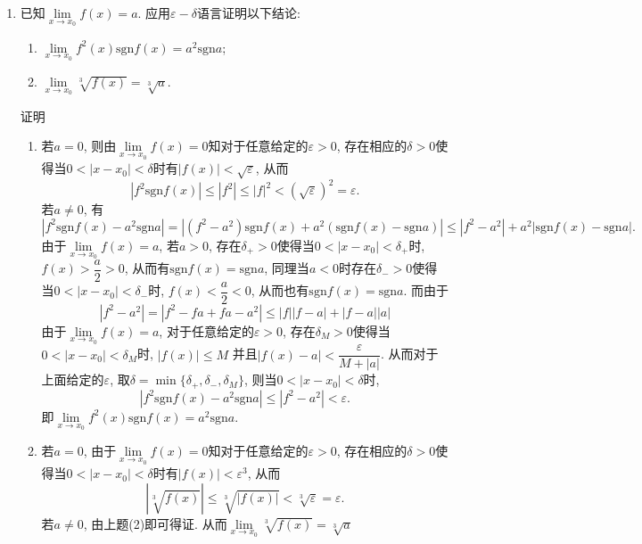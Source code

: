 \documentclass[UTF8,a4paper,20pt]{article}
\begin{document}
\begin{enumerate}[1.]
\item 已知$\lim\limits_{x\to x_0} f(x)=a$. 应用$\varepsilon-\delta$语言证明以下结论: 
	\begin{enumerate}[(1)]
	\item $\lim\limits_{x\to x_0}f^2(x)\mathrm{sgn} f(x)=a^2\mathrm{sgn} a$;
	\item $\lim\limits_{x\to x_0}\sqrt[3]{f(x)}=\sqrt[3]{a}$.
	\end{enumerate}
{\heiti 证明}\\
	\begin{enumerate}[(1)]
	\item 若$a=0$, 则由$\lim\limits_{x\to x_0}f(x)=0$知对于任意给定的$\varepsilon>0$, 存在相应的$\delta>0$使得当$0<|x-x_0|<\delta$时有$|f(x)|<\sqrt{\varepsilon}$, 从而
\[ |f^2\mathrm{sgn}f(x)|\leqslant|f^2|\leqslant|f|^2<(\sqrt{\varepsilon})^2=\varepsilon. \]
	若$a\neq 0$, 有
\[ |f^2\mathrm{sgn}f(x)-a^2\mathrm{sgn}a|=|(f^2-a^2)\mathrm{sgn}f(x)+a^2(\mathrm{sgn}f(x)-\mathrm{sgn}a)|\leqslant|f^2-a^2|+a^2|\mathrm{sgn}f(x)-\mathrm{sgn}a|. \]
由于$\lim\limits_{x\to x_0}f(x)=a$, 若$a>0$, 存在$\delta_{+}>0$使得当$0<|x-x_0|<\delta_{+}$时, $f(x)>\dfrac{a}{2}>0$, 从而有$\mathrm{sgn}f(x)=\mathrm{sgn}a$, 同理当$a<0$时存在$\delta_{-}>0$使得当$0<|x-x_0|<\delta_{-}$时, $f(x)<\dfrac{a}{2}<0$, 从而也有$\mathrm{sgn}f(x)=\mathrm{sgn}a$. 而由于
	\[ |f^2-a^2|=|f^2-fa+fa-a^2|\leqslant|f||f-a|+|f-a||a|\]
由于$\lim\limits_{x\to x_0}f(x)=a$, 对于任意给定的$\varepsilon>0$, 存在$\delta_{M}>0$使得当$0<|x-x_0|<\delta_{M}$时, $|f(x)|\leqslant M$ 并且$|f(x)-a|<\dfrac{\varepsilon}{M+|a|}$. 从而对于上面给定的$\varepsilon$, 取$\delta=\min\{\delta_{+},\delta_{-},\delta_{M}\}$, 则当$0<|x-x_0|<\delta$时, 
	\[|f^2\mathrm{sgn}f(x)-a^2\mathrm{sgn}a|\leqslant|f^2-a^2|<\varepsilon.\]
即$\lim\limits_{x\to x_0}f^2(x)\mathrm{sgn} f(x)=a^2\mathrm{sgn} a$.
	
	\item 若$a=0$, 由于$\lim\limits_{x\to x_0}f(x)=0$知对于任意给定的$\varepsilon>0$, 存在相应的$\delta>0$使得当$0<|x-x_0|<\delta$时有$|f(x)|<\varepsilon^3$, 从而
\[ |\sqrt[3]{f(x)}|\leqslant\sqrt[3]{|f(x)|}<\sqrt[3]{\varepsilon}=\varepsilon.\]
	若$a\neq 0$, 由上题(2)即可得证. 从而$\lim\limits_{x\to x_0}\sqrt[3]{f(x)}=\sqrt[3]{a}$
	\end{enumerate}


\end{enumerate}
\end{document}
